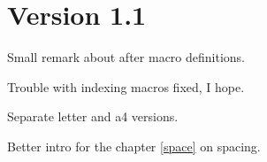 \section*{Version 1.1}

Small remark about  after macro definitions.

Trouble with indexing macros fixed, I hope.

Separate letter and a4 versions.

Better intro for the chapter \ref{space} on spacing.

